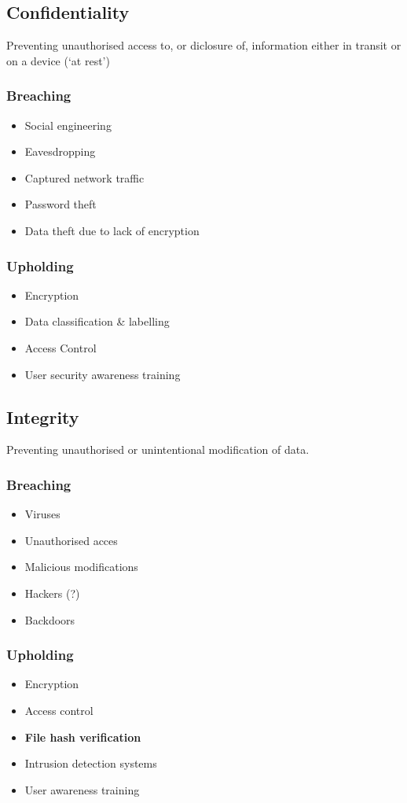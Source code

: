 \documentclass[12pt]{report}
\begin{document}
\subsection{Confidentiality}
Preventing unauthorised access to, or diclosure of, information either in transit or on a device (`at rest') 
\begin{multicols}{2}
\subsubsection{Breaching}
\begin{itemize}
	\item Social engineering
	\item Eavesdropping
	\item Captured network traffic 
	\item Password theft
	\item Data theft due to lack of encryption
\end{itemize}
\subsubsection{Upholding}
\begin{itemize}
	\item Encryption
	\item Data classification \& labelling
	\item Access Control
	\item User security awareness training
\end{itemize}
\end{multicols}

\subsection{Integrity}
Preventing unauthorised or unintentional modification of data.
\begin{multicols}{2}
\subsubsection{Breaching}
\begin{itemize}
	\item Viruses
	\item Unauthorised acces
	\item Malicious modifications
	\item Hackers (?)
	\item Backdoors
\end{itemize}
\subsubsection{Upholding}
\begin{itemize}
	\item Encryption
	\item Access control
	\item \textbf{File hash verification}
	\item Intrusion detection systems
	\item User awareness training
\end{itemize}
\end{multicols}
\end{document}
